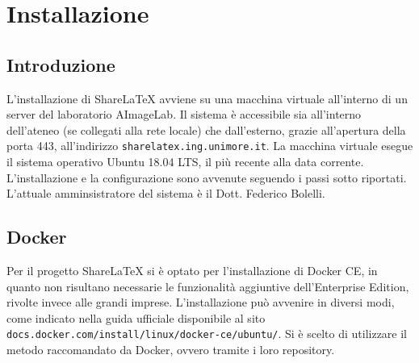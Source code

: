\chapter{Installazione}
\label{Installazione}
\thispagestyle{empty}
\lstset{style=my-bash}

\section{Introduzione}
L'installazione di ShareLaTeX avviene su una macchina virtuale all'interno di un server del laboratorio AImageLab. Il sistema è accessibile sia all'interno dell'ateneo (se collegati alla rete locale) che dall'esterno, grazie all'apertura della porta 443, all'indirizzo \verb|sharelatex.ing.unimore.it|. La macchina virtuale esegue il sistema operativo Ubuntu 18.04 LTS, il più recente alla data corrente. L'installazione e la configurazione sono avvenute seguendo i passi sotto riportati. L'attuale amminsistratore del sistema è il Dott. Federico Bolelli.

\section{Docker}
Per il progetto ShareLaTeX si è optato per l'installazione di Docker CE, in quanto non risultano necessarie le funzionalità aggiuntive dell'Enterprise Edition, rivolte invece alle grandi imprese. L'installazione può avvenire in diversi modi, come indicato nella guida ufficiale disponibile al sito \verb|docs.docker.com/install/linux/docker-ce/ubuntu/|. Si è scelto di utilizzare il metodo raccomandato da Docker, ovvero tramite i loro repository.

